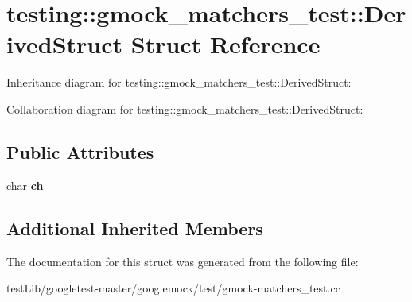 \hypertarget{structtesting_1_1gmock__matchers__test_1_1DerivedStruct}{}\section{testing\+:\+:gmock\+\_\+matchers\+\_\+test\+:\+:Derived\+Struct Struct Reference}
\label{structtesting_1_1gmock__matchers__test_1_1DerivedStruct}


Inheritance diagram for testing\+:\+:gmock\+\_\+matchers\+\_\+test\+:\+:Derived\+Struct\+:


Collaboration diagram for testing\+:\+:gmock\+\_\+matchers\+\_\+test\+:\+:Derived\+Struct\+:
\subsection*{Public Attributes}
\begin{DoxyCompactItemize}
\item 
\mbox{\label{structtesting_1_1gmock__matchers__test_1_1DerivedStruct_abd7de960817b2c889f109ae6f2869f4c}} 
char {\bfseries ch}
\end{DoxyCompactItemize}
\subsection*{Additional Inherited Members}


The documentation for this struct was generated from the following file\+:\begin{DoxyCompactItemize}
\item 
test\+Lib/googletest-\/master/googlemock/test/gmock-\/matchers\+\_\+test.\+cc\end{DoxyCompactItemize}
